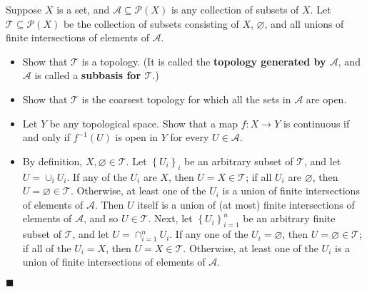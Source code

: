 \documentclass[12pt]{article}
\renewcommand{\qed}{\hfill$\blacksquare$}
\renewenvironment{proof}{\begin{addmargin}[1em]{0em}\begin{newproof}}{\end{newproof}\end{addmargin}\qed}
\newenvironment{problem}[2][Problem]{\begin{trivlist}
\item[\hskip \labelsep {\bfseries #1}\hskip \labelsep {\bfseries #2.}]}{\end{trivlist}}
\begin{document}
\begin{problem}{2-12}
Suppose $X$ is a set, and $\mathcal{A}\subseteq \mathcal{P}\left(X\right)$ is any collection of subsets of $X$. Let $\mathcal{T}\subseteq \mathcal{P}\left(X\right)$ be the collection of subsets consisting of $X$, $\varnothing$, and all unions of finite intersections of elements of $\mathcal{A}$.
\begin{itemize}
	\item Show that $\mathcal{T}$ is a topology. (It is called the \textbf{topology generated by $\mathcal{A}$}, and $\mathcal{A}$ is called a \textbf{subbasis for $\mathcal{T}$}.)
	\item Show that $\mathcal{T}$ is the coarsest topology for which all the sets in $\mathcal{A}$ are open.
	\item Let $Y$ be any topological space. Show that a map $f:X\rightarrow Y$ is continuous if and only if $f^{-1}\left(U\right)$ is open in $Y$ for every $U\in \mathcal{A}$.
\end{itemize}
\end{problem}
\begin{proof}
\begin{itemize}
	\item By definition, $X,\varnothing \in \mathcal{T}$. Let $\left\{U_i\right\}_i$ be an arbitrary subset of $\mathcal{T}$, and let $U = \cup_i U_i$. If any of the $U_i$ are $X$, then $U=X \in \mathcal{T}$; if all $U_i$ are $\varnothing$, then $U = \varnothing \in \mathcal{T}$. Otherwise, at least one of the $U_i$ is a union of finite intersections of elements of $\mathcal{A}$. Then $U$ itself is a union of (at most) finite intersections of elements of $\mathcal{A}$, and so $U \in \mathcal{T}$. Next, let $\left\{U_i\right\}_{i=1}^n$ be an arbitrary finite subset of $\mathcal{T}$, and let $U = \cap_{i=1}^n U_i$. If any one of the $U_i=\varnothing$, then $U = \varnothing \in \mathcal{T}$; if all of the $U_i = X$, then $U=X\in \mathcal{T}$. Otherwise, at least one of the $U_i$ is a union of finite intersections of elements of $\mathcal{A}$. 
\end{itemize}
\end{proof}
\end{document}

